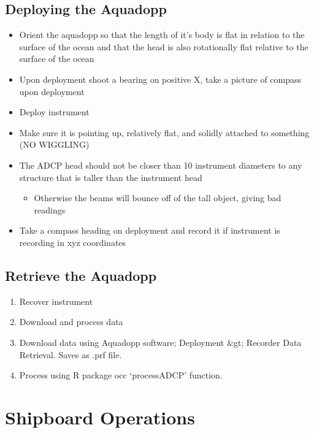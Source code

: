 \documentclass[]{book}
\providecommand{\tightlist}{%
  \setlength{\itemsep}{0pt}\setlength{\parskip}{0pt}}
\begin{document}
\section{Deploying the Aquadopp}\label{deploying-the-aquadopp}

\begin{itemize}
\tightlist
\item
  Orient the aquadopp so that the length of it's body is flat in
  relation to the surface of the ocean and that the head is also
  rotationally flat relative to the surface of the ocean
\item
  Upon deployment shoot a bearing on positive X, take a picture of
  compass upon deployment
\item
  Deploy instrument
\item
  Make sure it is pointing up, relatively flat, and solidly attached to
  something (NO WIGGLING)
\item
  The ADCP head should not be closer than 10 instrument diameters to any
  structure that is taller than the instrument head

  \begin{itemize}
  \tightlist
  \item
    Otherwise the beams will bounce off of the tall object, giving bad
    readings
  \end{itemize}
\item
  Take a compass heading on deployment and record it if instrument is
  recording in xyz coordinates
\end{itemize}

\section{Retrieve the Aquadopp}\label{retrieve-the-aquadopp}

\begin{enumerate}
\def\labelenumi{\arabic{enumi}.}
\tightlist
\item
  Recover instrument
\item
  Download and process data
\item
  Download data using Aquadopp software; Deployment \&gt; Recorder Data
  Retrieval. Saves as .prf file.
\item
  Process using R package occ `processADCP' function.
\end{enumerate}

\chapter{Shipboard Operations}\label{shipboard-operations}
\end{document}
